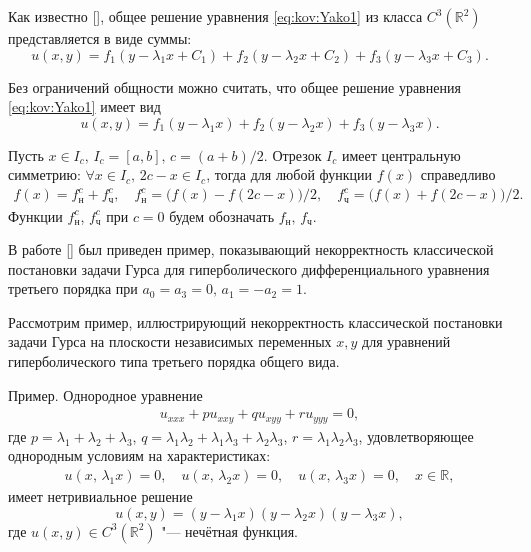 Как известно [], общее решение уравнения \eqref{eq:kov:Yako1} из класса $C^{3}(\mathbb{R}^{2})$ представляется в
виде суммы:
$$
u(x,y)=f_{1}(y-\lambda_{1}x+C_{1})+f_{2}(y-\lambda_{2}x+C_{2})+f_{3}(y-\lambda_{3}x+C_{3}).
$$

Без ограничений общности можно считать, что общее решение уравнения \eqref{eq:kov:Yako1} имеет вид
\begin{equation}
u(x,y)=f_{1}(y-\lambda_{1}x)+f_{2}(y-\lambda_{2}x)+f_{3}(y-\lambda_{3}x). 
\label{eq:kov:Yako4}
\end{equation}

Пусть $x\in I_{c},\, I_{c}=[a, b],\,c=({a+b})/{2}$. Отрезок
$I_{c}$ имеет центральную симметрию: $\forall x\in I_{c},\, 2c-x \in I_{c}$, тогда для любой функции $f(x)$ справедливо
\begin{gather*}
f(x)=f_{{\text{н}}}^{c}+f_{{\text{ч}}}^{c}, \quad  f_{{\text{н}}}^{c}=\bigl(f(x)-f(2c-x)\bigr)/2,\quad 
f_{{\text{ч}}}^{c}=\bigl(f(x)+f(2c-x)\bigr)/2.
\end{gather*}
Функции $ f_{{\text{н}}}^{c}$,  $f_{{\text{ч}}}^{c}$
при $c=0$ будем обозначать  $f_{{\text{н}}},\,f_{{\text{ч}}}$.

\smallskip

В работе  [] был приведен пример,
показывающий некорректность классической постановки задачи Гурса
для гиперболического дифференциального уравнения третьего порядка
при $a_{0}=a_{3}=0,\,a_{1}=-a_{2}=1$.

Рассмотрим пример, иллюстрирующий некорректность классической
постановки задачи Гурса на плоскости независимых переменных $x, y$
для уравнений гиперболического типа третьего порядка общего вида.

\smallskip

{\sc Пример.}   Однородное уравнение
\begin{gather}
u_{xxx}+pu_{xxy}+qu_{xyy}+ru_{yyy}=0,\label{eq:kov:Yako2}
\end{gather}
где  $p=\lambda_{1}+\lambda_{2}+\lambda_{3}$,
$q=\lambda_{1}\lambda_{2}+\lambda_{1}\lambda_{3}+\lambda_{2}\lambda_{3}$,
$r=\lambda_{1}\lambda_{2}\lambda_{3}$,
удовлетворяющее однородным условиям на характеристиках:
\begin{gather}
\label{eq:kov:Yako21}
u\left(x,\,\lambda_{1}x\right)=0,\quad 
u\left(x,\,\lambda_{2}x\right)=0,\quad 
u\left(x,\,\lambda_{3}x\right)=0,\quad x\in\mathbb{R},
\end{gather}
имеет нетривиальное решение
\begin{equation}
u(x,y)=(y-\lambda_{1}x)(y-\lambda_{2}x)(y-\lambda_{3}x),\label{eq:kov:Yako22}
\end{equation}
где $ u(x,y)\in C^{3}(\mathbb{R}^2)$ "--- нечётная функция.
\smallskip

